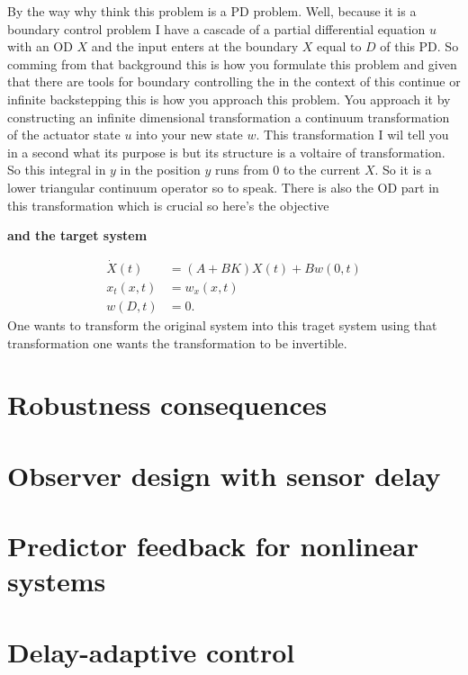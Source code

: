 \documentclass[idxtotoc,hyperref,openany]{labbook} %
\begin{document}
By the way why think this problem is a PD problem. Well, because it is a boundary control problem I have a cascade of a partial differential equation $u$ with an OD $X$ and the input enters at the boundary $X$ equal to $D$ of this PD. So comming from that background this is how you formulate this problem and given that there are tools for boundary controlling the in the context of this continue or infinite backstepping this is how you approach this problem. You approach it by constructing an infinite dimensional transformation a continuum transformation of the actuator state $u$ into your new state $w$. This transformation I wil tell you in a second what its purpose is but its structure is a voltaire of transformation. So this integral in $y$ in the position $y$ runs from $0$ to the current $X$. So it is a lower triangular continuum operator so to speak. There is also the OD part in this transformation which is crucial so here's the objective

\bf{and the target system}

\begin{equation}
    \begin{aligned}
        \dot{X}(t) &= (A + BK)X(t) + Bw(0,t)\\
        x_t(x,t) &= w_x(x,t)\\
        w(D,t) &= 0.
    \end{aligned}
\end{equation} One wants to transform the original system into this traget system using that transformation one wants the transformation to be invertible.


\section{Robustness consequences}

\section{Observer design with sensor delay}

\section{Predictor feedback for nonlinear systems}

\section{Delay-adaptive control}
\end{document}
